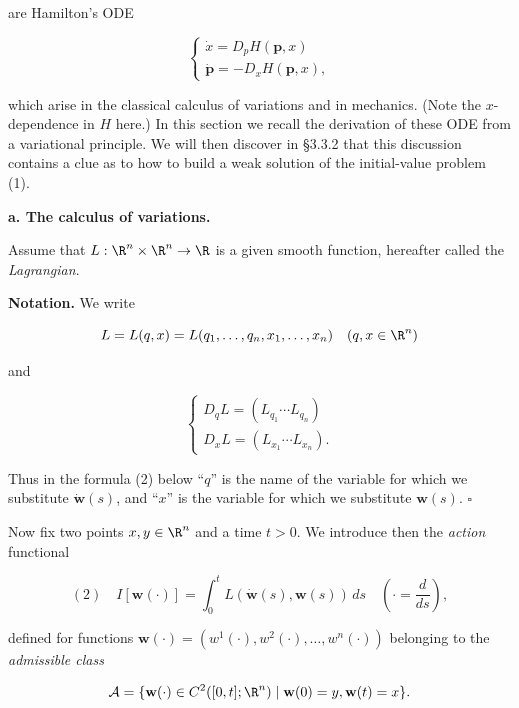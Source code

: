 are Hamilton's ODE

$$\begin{cases}
\dot{x} = D_p H(\mathbf{p}, x) \\
\dot{\mathbf{p}} = -D_x H(\mathbf{p}, x),
\end{cases}$$

which arise in the classical calculus of variations and in mechanics. (Note the $x$-dependence in $H$ here.) In this section we recall the derivation of these ODE from a variational principle. We will then discover in \S 3.3.2 that this discussion contains a clue as to how to build a weak solution of the initial-value problem (1).

\textbf{a. The calculus of variations.}

Assume that $L : \R^n \times \R^n \to \R$ is a given smooth function, hereafter called the \textit{Lagrangian}.

\textbf{Notation.} We write

$$L = L(q,x) = L(q_1, \ldots, q_n, x_1, \ldots, x_n) \quad (q, x \in \R^n)$$

and

$$\begin{cases}
D_q L = (L_{q_1} \cdots L_{q_n}) \\
D_x L = (L_{x_1} \cdots L_{x_n}).
\end{cases}$$

Thus in the formula (2) below ``$q$'' is the name of the variable for which we substitute $\dot{\mathbf{w}}(s)$, and ``$x$'' is the variable for which we substitute $\mathbf{w}(s)$.
$\square$

Now fix two points $x, y \in \R^n$ and a time $t > 0$. We introduce then the \textit{action} functional

$$(2) \quad I[\mathbf{w}(\cdot)] = \int_0^t L(\dot{\mathbf{w}}(s), \mathbf{w}(s)) \, ds \quad \left(\cdot = \frac{d}{ds}\right),$$

defined for functions $\mathbf{w}(\cdot) = (w^1(\cdot), w^2(\cdot), \ldots, w^n(\cdot))$ belonging to the \textit{admissible class}

$$\mathcal{A} = \{\mathbf{w}(\cdot) \in C^2([0,t]; \R^n) \mid \mathbf{w}(0) = y, \mathbf{w}(t) = x\}.$$

\begin{figure}[h]\centering
\end{figure}

